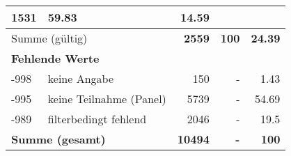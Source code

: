 \begin{longtable}{lXrrr}
       \num{1531} &
       \num[round-mode=places,round-precision=2]{59,83} &
         \num[round-mode=places,round-precision=2]{14,59} \\
     \midrule
     \multicolumn{2}{l}{Summe (gültig)} &
       \textbf{\num{2559}} &
     \textbf{100} &
       \textbf{\num[round-mode=places,round-precision=2]{24,39}} \\
     \multicolumn{5}{l}{\textbf{Fehlende Werte}}\\
       -998 &
       keine Angabe &
         \num{150} &
        - &
         \num[round-mode=places,round-precision=2]{1,43} \\
       -995 &
       keine Teilnahme (Panel) &
         \num{5739} &
        - &
         \num[round-mode=places,round-precision=2]{54,69} \\
       -989 &
       filterbedingt fehlend &
         \num{2046} &
        - &
         \num[round-mode=places,round-precision=2]{19,5} \\
     \midrule
     \multicolumn{2}{l}{\textbf{Summe (gesamt)}} &
          \textbf{\num{10494}} &
        \textbf{-} &
        \textbf{100} \\
     \bottomrule
     \end{longtable}
     
